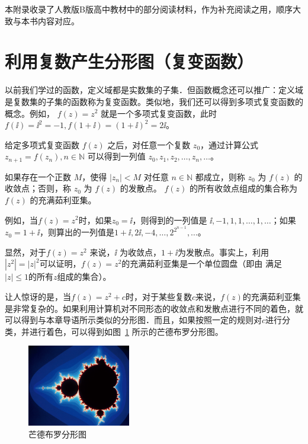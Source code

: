 \documentclass[a4paper,openany]{ctexbook}
\begin{document}
本附录收录了人教版B版高中教材中的部分阅读材料，作为补充阅读之用，顺序大致与本书内容对应。

\section{利用复数产生分形图（复变函数）}

以前我们学过的函数，定义域都是实数集的子集．但函数概念还可以推广：定义域是复数集的子集的函数称为复变函数。类似地，我们还可以得到多项式复变函数的概念。例如，%
\(f(z)=z^2\) 就是一个多项式复变函数，此时 \(f(\ii)=\ii^2=-1,f(1+\ii)=(1+\ii)^2=2\ii\)。

给定多项式复变函数 \(f(z)\) 之后，对任意一个复数 \(z_0\)，通过计算公式 \(z_{n+1}=f(z_n),n\in \mathbb{N}\) 可以得到一列值 \(z_0,z_1,z_2,\dots,z_n,\dots\)。

如果存在一个正数 \(M\)，使得 \(|z_n|<M\) 对任意 \(n\in \mathbb{N}\) 都成立，则称 \(z_0\) 为 \(f(z)\) 的收敛点；否则，称 \(z_0\) 为 \(f(z)\) 的发散点。%
\(f(z)\) 的所有收敛点组成的集合称为 \(f(z)\) 的充满茹利亚集。

例如，当\(f(z)=z^2\)时，如果\(z_0=\ii\)，则得到的一列值是 \(\ii,-1,1,1,\dots,1,\dots\)；如果 \(z_0=1+\ii\)，则算出的一列值是\(1+\ii,2\ii,-4,\dots,2^{2^{n-1}},\dots\)。

显然，对于\(f(z)=z^2\) 来说，\(\ii\) 为收敛点，\(1+\ii\)为发散点。事实上，利用\(|z^2|=|z|^2\)可以证明，\(f(z)=z^2\)的充满茹利亚集是一个单位圆盘（即由
满足\(|z|\le 1\)的所有\(z\)组成的集合）。

让人惊讶的是，当\(f(z)=z^2+c\)时，对于某些复数\(c\)来说，\(f(z)\)的充满茹利亚集是非常复杂的。如果利用计算机对不同形态的收敛点和发散点进行不同的着色，就
可以得到与本章导语所示类似的分形图．而且，如果按照一定的规则对\(c\)进行分类，并进行着色，可以得到如图~\ref{fgr:mhdebuloffxktu} 所示的芒德布罗分形图。

\begin{figure}
    \centering
    \includegraphics[width=0.4\textwidth]{image6.png}
    \caption{芒德布罗分形图}\label{fgr:mhdebuloffxktu}
\end{figure}
\end{document}
